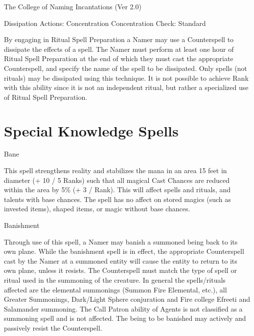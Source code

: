 \begin{Chapter}{The College of Naming Incantations (Ver 2.0)}
\begin{ritual}[Q-1]{Dissipation}
Actions: Concentration 
Concentration Check: Standard 
\begin{effects}
By engaging in Ritual Spell Preparation a Namer may use a Counterspell
to dissipate the effects of a spell. The Namer must perform at least
one hour of Ritual Spell Preparation at the end of which they must
cast the appropriate Counterspell, and specify the name of the spell
to be dissipated.  Only spells (not rituals) may be dissipated using
this technique.  It is not possible to achieve Rank with this ability
since it is not an independent ritual, but rather a specialized use of
Ritual Spell Preparation.
\end{effects}
\end{ritual}

\section{Special Knowledge Spells}

\begin{spell}[S-1]{Bane}

\begin{effects}
This spell strengthens reality and stabilizes the mana in an area 15
feet in diameter (+ 10 / 5 Ranks) such that all magical Cast Chances
are reduced within the area by 5\% (+ 3 / Rank).  This will affect
spells and rituals, and talents with base chances.  The spell has no
affect on stored magics (such as invested items), shaped items, or
magic without base chances.
\end{effects}
\end{spell}

\begin{spell}[S-2]{Banishment}

\begin{effects}
Through use of this spell, a Namer may banish a summoned being back to
its own plane.  While the banishment spell is in effect, the
appropriate Counterspell cast by the Namer at a summoned entity will
cause the entity to return to its own plane, unless it resists. The
Counterspell must match the type of spell or ritual used in the
summoning of the creature. In general the spells/rituals affected are
the elemental summonings (Summon Fire Elemental, etc.), all Greater
Summonings, Dark/Light Sphere conjuration and Fire college Efreeti and
Salamander summoning.  The Call Patron ability of Agents is not
classified as a summoning spell and is not affected.  The being to be
banished may actively and passively resist the Counterspell.
\end{effects}
\end{spell}


\end{Chapter}
